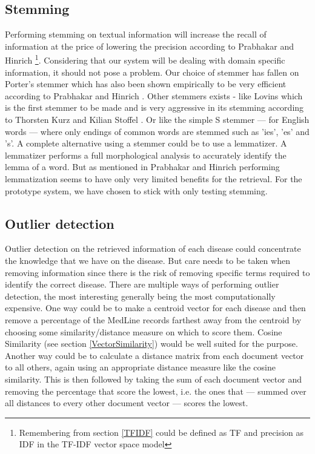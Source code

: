 \subsection{Stemming}

Performing stemming on textual information will increase the recall of
information at the price of lowering the precision according to
Prabhakar and Hinrich \cite{IntroIR2009}\footnote{Remembering from
  section \ref{TFIDF} could be defined as TF and precision as IDF in
  the TF-IDF vector space model}. Considering that our system will be
dealing with domain specific information, it should not pose a
problem. Our choice of stemmer has fallen on Porter's stemmer which
has also been shown empirically to be very efficient according to
Prabhakar and Hinrich \cite{IntroIR2009}. Other stemmers exists - like
Lovins which is the first stemmer to be made and is very aggressive in
its stemming according to Thorsten Kurz and Kilian Stoffel
\cite{Kurz2002309}. Or like the simple S stemmer --- for English words ---
where only endings of common words are stemmed such as 'ies', 'es' and
's'. A complete alternative using a stemmer could be to use a
lemmatizer. A lemmatizer performs a full morphological analysis to
accurately identify the lemma of a word. But as mentioned in Prabhakar
and Hinrich \cite{IntroIR2009} performing lemmatization seems to have
only very limited benefits for the retrieval. For the prototype
system, we have chosen to stick with only testing stemming.

\subsection{Outlier detection}

Outlier detection on the retrieved information of each disease could
concentrate the knowledge that we have on the disease. But care needs
to be taken when removing information since there is the risk of
removing specific terms required to identify the correct
disease. There are multiple ways of performing outlier detection, the
most interesting generally being the most computationally
expensive. One way could be to make a centroid vector for each disease
and then remove a percentage of the MedLine records farthest away from
the centroid by choosing some similarity/distance measure on which to
score them. Cosine Similarity (see section \ref{VectorSimilarity}) would be well
suited for the purpose. Another way could be to calculate a distance
matrix from each document vector to all others, again using an
appropriate distance measure like the cosine similarity. This is then
followed by taking the sum of each document vector and removing the
percentage that score the lowest, i.e. the ones that --- summed over all
distances to every other document vector --- scores the lowest. \\

